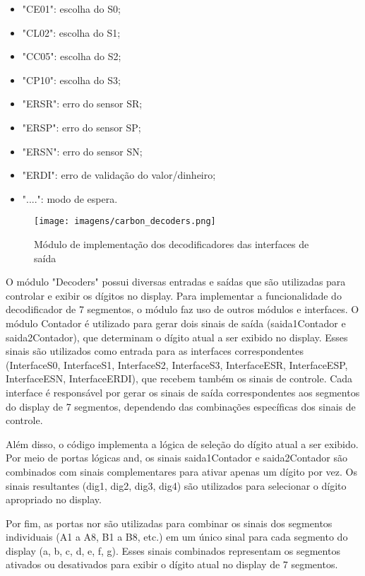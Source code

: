 \begin{itemize}
    \item "CE01": escolha do S0;
    \item "CL02": escolha do S1;
    \item "CC05": escolha do S2;
    \item "CP10": escolha do S3;
    \item "ERSR": erro do sensor SR;
    \item "ERSP": erro do sensor SP;
    \item "ERSN": erro do sensor SN;
    \item "ERDI": erro de validação do valor/dinheiro;
    \item "....": modo de espera.
\end{itemize}

\begin{figure}[!h]
    \centering
    \texttt{[image: imagens/carbon\_decoders.png]}
    \caption{Módulo de implementação dos decodificadores das interfaces de saída}
    \label{fig:carbon_decoders}
\end{figure}

O módulo "Decoders" possui diversas entradas e saídas que são utilizadas para controlar e exibir os dígitos no display. Para implementar a funcionalidade do decodificador de 7 segmentos, o módulo faz uso de outros módulos e interfaces. O módulo Contador é utilizado para gerar dois sinais de saída (saida1Contador e saida2Contador), que determinam o dígito atual a ser exibido no display. Esses sinais são utilizados como entrada para as interfaces correspondentes (InterfaceS0, InterfaceS1, InterfaceS2, InterfaceS3, InterfaceESR, InterfaceESP, InterfaceESN, InterfaceERDI), que recebem também os sinais de controle. Cada interface é responsável por gerar os sinais de saída correspondentes aos segmentos do display de 7 segmentos, dependendo das combinações específicas dos sinais de controle.

Além disso, o código implementa a lógica de seleção do dígito atual a ser exibido. Por meio de portas lógicas and, os sinais saida1Contador e saida2Contador são combinados com sinais complementares para ativar apenas um dígito por vez. Os sinais resultantes (dig1, dig2, dig3, dig4) são utilizados para selecionar o dígito apropriado no display.

Por fim, as portas nor são utilizadas para combinar os sinais dos segmentos individuais (A1 a A8, B1 a B8, etc.) em um único sinal para cada segmento do display (a, b, c, d, e, f, g). Esses sinais combinados representam os segmentos ativados ou desativados para exibir o dígito atual no display de 7 segmentos.

